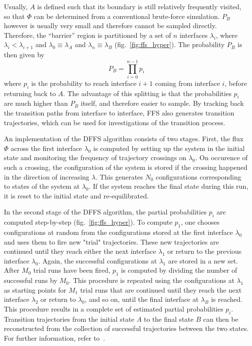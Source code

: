 \documentclass[a4paper,oneside]{article}
\begin{document}
Usually, $A$ is defined such that its boundary is still relatively frequently visited, so that $\Phi$ can be determined from a conventional brute-force simulation. $P_B$ however is usually very small and therefore cannot be sampled directly. Therefore, the ``barrier'' region is partitioned by a set of $n$ interfaces $\lambda_i$, where $\lambda_i < \lambda_{i+1}$ and $\lambda_0 \equiv \lambda_A$ and $\lambda_n \equiv \lambda_B$ (fig.~\ref{fig:ffs_hyper}).
The probability $P_B$ is then given by
\begin{equation}\label{eq:ppi}
P_B = \prod_{i=0}^{n-1}p_i
\end{equation}
where $p_i$ is the probability to reach interface $i+1$ coming from interface $i$, before returning back to $A$. The advantage of this splitting is that the probabilities $p_i$ are much higher than $P_B$ itself, and therefore easier to sample. By tracking back the transition paths from interface to interface, FFS also generates transition trajectories, which can be used for investigations of the transition process.

An implementation of the DFFS algorithm consists of two stages. First, the flux $\Phi$ across the first interface $\lambda_0$ is computed by setting up the system in the initial state and monitoring the frequency of trajectory crossings on $\lambda_0$. On occurence of such a crossing, the configuration of the system is stored if the crossing happened in the direction of increasing $\lambda$. This generates $N_0$ configurations corresponding to states of the system at $\lambda_0$. If the system reaches the final state during this run, it is reset to the initial state and re-equilibrated.

In the second stage of the DFFS algorithm, the partial probabilities $p_i$ are computed step-by-step (fig.~\ref{fig:ffs_hyper}). To compute $p_1$, one chooses configurations at random from the configurations stored at the first interface $\lambda_0$  and uses them to fire new "trial" trajectories. These new trajectories are continued until they reach either the next interface $\lambda_1$ or return to the previous interface $\lambda_0$. Again, the successful configurations at $\lambda_1$ are stored in a new set. After $M_0$ trial runs have been fired, $p_1$ is computed by dividing the number of successful runs by $M_0$.  This procedure is repeated using the configurations at $\lambda_1$ as starting points for $M_1$ trial runs that are continued until they reach the next interface $\lambda_2$ or return to $\lambda_0$, and so on, until the final interface at $\lambda_B$ is reached. This procedure results in a complete set of estimated partial probabilities $p_i$. Transition trajectories from the initial 
state $A$ to the final state $B$ can then be reconstructed from the collection of successful trajectories between the two states. For further information, refer to~\cite{fFFS,FFSAllen,efficiency,ffs,barrier}.
\end{document}
